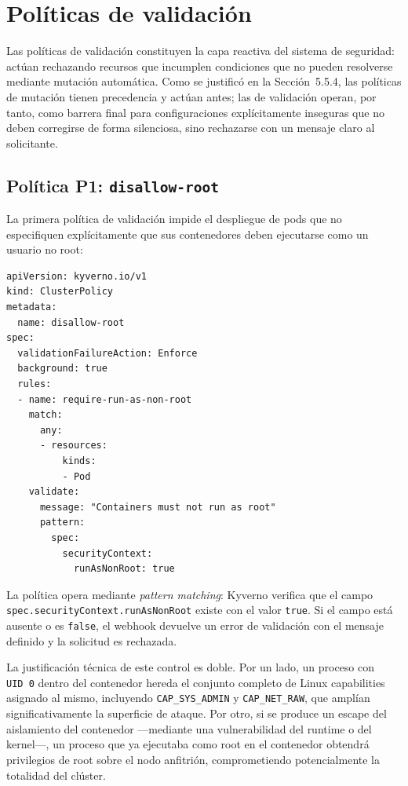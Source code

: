 \section{Políticas de validación}

Las políticas de validación constituyen la capa reactiva del sistema de seguridad: actúan rechazando recursos que incumplen condiciones que no pueden resolverse mediante mutación automática. Como se justificó en la Sección~5.5.4, las políticas de mutación tienen precedencia y actúan antes; las de validación operan, por tanto, como barrera final para configuraciones explícitamente inseguras que no deben corregirse de forma silenciosa, sino rechazarse con un mensaje claro al solicitante.

\subsection{Política P1: \texttt{disallow-root}}

La primera política de validación impide el despliegue de pods que no especifiquen explícitamente que sus contenedores deben ejecutarse como un usuario no root:

\begin{lstlisting}
apiVersion: kyverno.io/v1
kind: ClusterPolicy
metadata:
  name: disallow-root
spec:
  validationFailureAction: Enforce
  background: true
  rules:
  - name: require-run-as-non-root
    match:
      any:
      - resources:
          kinds:
          - Pod
    validate:
      message: "Containers must not run as root"
      pattern:
        spec:
          securityContext:
            runAsNonRoot: true
\end{lstlisting}

La política opera mediante \textit{pattern matching}: Kyverno verifica que el campo \texttt{spec.security\allowbreak{}Context.\allowbreak{}runAsNonRoot} existe con el valor \texttt{true}. Si el campo está ausente o es \texttt{false}, el webhook devuelve un error de validación con el mensaje definido y la solicitud es rechazada.

La justificación técnica de este control es doble. Por un lado, un proceso con \texttt{UID~0} dentro del contenedor hereda el conjunto completo de Linux capabilities asignado al mismo, incluyendo \texttt{CAP\_SYS\_ADMIN} y \texttt{CAP\_NET\_RAW}, que amplían significativamente la superficie de ataque. Por otro, si se produce un escape del aislamiento del contenedor —mediante una vulnerabilidad del runtime o del kernel—, un proceso que ya ejecutaba como root en el contenedor obtendrá privilegios de root sobre el nodo anfitrión, comprometiendo potencialmente la totalidad del clúster.

